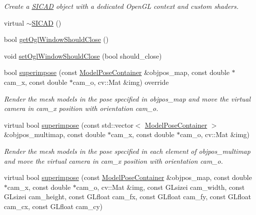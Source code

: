 \begin{DoxyCompactItemize}
\begin{DoxyCompactList}\small\item\em Create a \mbox{\hyperlink{classSICAD}{S\+I\+C\+AD}} object with a dedicated Open\+GL context and custom shaders. \end{DoxyCompactList}\item 
virtual \mbox{\hyperlink{classSICAD_a4e3d6d1f90ea2261dcd8507ee8709360}{$\sim$\+S\+I\+C\+AD}} ()
\item 
bool \mbox{\hyperlink{classSICAD_aaf003ab2ac8bc5ebdef6611ca1547e73}{get\+Ogl\+Window\+Should\+Close}} ()
\item 
void \mbox{\hyperlink{classSICAD_a0e42acab32252ddc878794f365ee1037}{set\+Ogl\+Window\+Should\+Close}} (bool should\+\_\+close)
\item 
bool \mbox{\hyperlink{classSICAD_a356e0ac8a0f130952a72326bedd4ab60}{superimpose}} (const \mbox{\hyperlink{classSuperimpose_a178e3d4e2def6635bfcf9454dd4b5d22}{Model\+Pose\+Container}} \&objpos\+\_\+map, const double $\ast$cam\+\_\+x, const double $\ast$cam\+\_\+o, cv\+::\+Mat \&img) override
\begin{DoxyCompactList}\small\item\em Render the mesh models in the pose specified in {\ttfamily objpos\+\_\+map} and move the virtual camera in {\ttfamily cam\+\_\+x} position with orientation {\ttfamily cam\+\_\+o}. \end{DoxyCompactList}\item 
virtual bool \mbox{\hyperlink{classSICAD_ab15f84cec5a65c8dd6cad85f9b0e1993}{superimpose}} (const std\+::vector$<$ \mbox{\hyperlink{classSuperimpose_a178e3d4e2def6635bfcf9454dd4b5d22}{Model\+Pose\+Container}} $>$ \&objpos\+\_\+multimap, const double $\ast$cam\+\_\+x, const double $\ast$cam\+\_\+o, cv\+::\+Mat \&img)
\begin{DoxyCompactList}\small\item\em Render the mesh models in the pose specified in each element of {\ttfamily objpos\+\_\+multimap} and move the virtual camera in {\ttfamily cam\+\_\+x} position with orientation {\ttfamily cam\+\_\+o}. \end{DoxyCompactList}\item 
virtual bool \mbox{\hyperlink{classSICAD_af6c19a679de29992c5f9609f4424add0}{superimpose}} (const \mbox{\hyperlink{classSuperimpose_a178e3d4e2def6635bfcf9454dd4b5d22}{Model\+Pose\+Container}} \&objpos\+\_\+map, const double $\ast$cam\+\_\+x, const double $\ast$cam\+\_\+o, cv\+::\+Mat \&img, const G\+Lsizei cam\+\_\+width, const G\+Lsizei cam\+\_\+height, const G\+Lfloat cam\+\_\+fx, const G\+Lfloat cam\+\_\+fy, const G\+Lfloat cam\+\_\+cx, const G\+Lfloat cam\+\_\+cy)

\end{DoxyCompactItemize}
